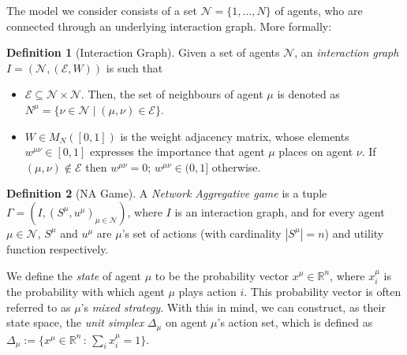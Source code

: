 \documentclass{article}
\theoremstyle{definition}
\newtheorem{definition}{Definition}
\newcommand{\agentset}{\mathcal{N}}
\newcommand{\edgeset}{\mathcal{E}}
\newcommand{\weightset}{W}
\newcommand{\actionset}[1]{S^{#1}}
\newcommand{\utility}[1]{u^{#1}}
\newcommand{\wmunu}{w^{\mu \nu}}
\newcommand{\xmu}{x^{\mu}}
\newcommand{\xmuaction}[1]{x^{\mu}_{#1}}
\begin{document}
The model we consider consists of
a set $\agentset = \{1,
\ldots , N \}$ of agents, who are connected through an underlying
interaction graph.
More formally:
%        
\begin{definition}[Interaction Graph] \label{interactiongraph}
	Given a set of agents $\agentset$, an {\em interaction graph} $I = (\agentset, (\edgeset,
	\weightset))$ is such that
	\begin{itemize}[leftmargin=0.5cm]
		
		\item $\edgeset \subseteq \agentset \times \agentset$.  Then, the set of
		neighbours of agent $\mu$ is denoted as $N^\mu = \{\nu \in
		\agentset \mid (\mu, \nu) \in \edgeset\}$.
		
		\item $\weightset \in M_N([0, 1])$ is the weight adjacency matrix, whose elements $w^{\mu
			\nu} \in [0, 1]$ expresses the importance that agent $\mu$ places on agent $\nu$. If $(\mu, \nu) \not
		\in \edgeset$ then $w^{\mu \nu} = 0$;        $\wmunu \in (0, 1]$ otherwise.
	\end{itemize}
\end{definition}

%
\begin{definition}[NA Game]
	A {\em Network Aggregative game} is
	a tuple $\Gamma = (I, (\actionset{\mu},
	\utility{\mu})_{\mu \in \mathcal{N}})$, where $I$ is an
	interaction graph, and for every agent $\mu \in \mathcal{N}$, $\actionset{\mu}$ and $\utility{\mu}$
	are $\mu$'s set of actions (with cardinality $|\actionset{\mu}| = n$)
	and utility function respectively.
\end{definition}

We define the \emph{state} of agent $\mu$ to be the probability
vector $\xmu \in \mathbb{R}^n$, where $\xmu_i$ is the probability
with which agent $\mu$ plays action $i$.
This
probability vector is often referred to as $\mu$'s \emph{mixed
	strategy}. With this in mind, we can construct, as their state
space, the {\em unit simplex} $\Delta_\mu$ on agent $\mu$'s action set, which
is defined
as $\Delta_\mu := \{\xmu \in \mathbb{R}^n \, : \, \sum_i
\xmuaction{i} = 1\}$. 
\end{document}
